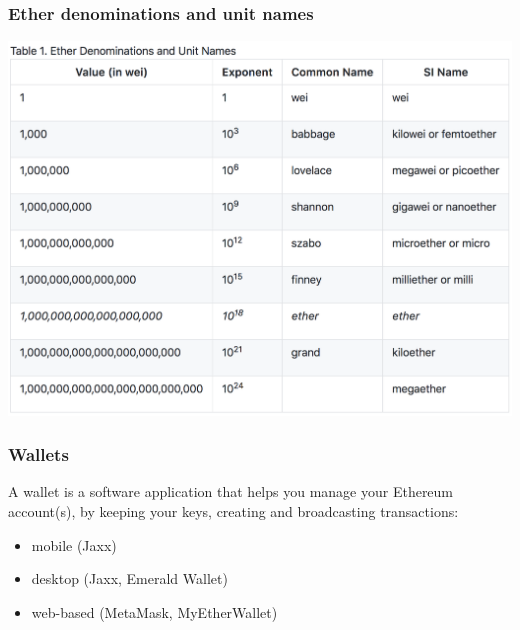 \documentclass[11pt]{beamer}  %
\begin{document}
\begin{frame}\frametitle{Ether denominations and unit names}

  \begin{center}
    \includegraphics[scale=0.2,clip=false]{pictures/ether-denominations.png}
  \end{center}

\end{frame}

\begin{frame}\frametitle{Wallets}

  \begin{greenbox}{}
    A wallet is a
    software application that helps you manage your Ethereum account(s),
    by keeping your keys, creating and broadcasting transactions:
    \begin{itemize}
    \item mobile (Jaxx)
    \item desktop (Jaxx, Emerald Wallet)
    \item web-based (MetaMask, MyEtherWallet)
    \end{itemize}
  \end{greenbox}

\end{frame}
\end{document}
